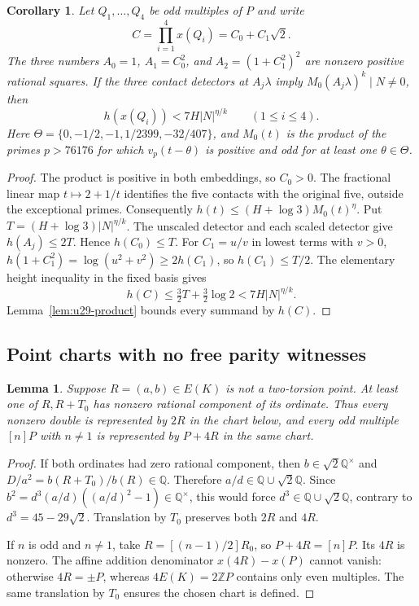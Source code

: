 \documentclass[11pt,a4paper]{article}
\newtheorem{lemma}[theorem]{Lemma}
\newtheorem{corollary}[theorem]{Corollary}
\theoremstyle{definition}
\theoremstyle{remark}
\begin{document}
\begin{corollary}\label{cor:u29-scales}
Let $Q_1,\ldots,Q_4$ be odd multiples of $P$ and write
\[
 C=\prod_{i=1}^4x(Q_i)=C_0+C_1\sqrt2.
\]
The three numbers $A_0=1$, $A_1=C_0^2$, and
$A_2=(1+C_1^2)^2$ are nonzero positive rational squares.
If the three contact detectors at $A_j\lambda$ imply
$M_0(A_j\lambda)^k\mid N\ne0$, then
\[
                         h(x(Q_i))<7H|N|^{\eta/k}
                         \qquad(1\le i\le4).
\]
Here $\Theta=\{0,-1/2,-1,1/2399,-32/407\}$, and $M_0(t)$
is the product of the primes $p>76176$ for which $v_p(t-\theta)$
is positive and odd for at least one $\theta\in\Theta$.
\end{corollary}
\begin{proof}
The product is positive in both embeddings, so $C_0>0$.
The fractional linear map $t\mapsto2+1/t$ identifies the five
contacts with the original five, outside the exceptional primes.
Consequently $h(t)\le(H+\log3)M_0(t)^{\eta}$.  Put
$T=(H+\log3)|N|^{\eta/k}$.  The unscaled detector and each scaled
detector give $h(A_j)\le2T$.  Hence $h(C_0)\le T$.
For $C_1=u/v$ in lowest terms with $v>0$,
$h(1+C_1^2)=\log(u^2+v^2)\ge2h(C_1)$, so $h(C_1)\le T/2$.
The elementary height inequality in the fixed basis gives
\[
 h(C)\le\tfrac32T+\tfrac32\log2<7H|N|^{\eta/k}.
\]
Lemma~\ref{lem:u29-product} bounds every summand by $h(C)$.
\end{proof}

\subsection{Point charts with no free parity witnesses}

\begin{lemma}\label{lem:u29-chart}
Suppose $R=(a,b)\in E(K)$ is not a two-torsion point.  At least one
of $R,R+T_0$ has nonzero rational component of its ordinate.
Thus every nonzero double is represented by $2R$ in the chart below,
and every odd multiple $[n]P$ with $n\ne1$ is represented by
$P+4R$ in the same chart.
\end{lemma}
\begin{proof}
If both ordinates had zero rational component, then
$b\in\sqrt2\mathbb Q^\times$ and
$D/a^2=b(R+T_0)/b(R)\in\mathbb Q$.  Therefore
$a/d\in\mathbb Q\cup\sqrt2\mathbb Q$.  Since
$b^2=d^3(a/d)((a/d)^2-1)\in\mathbb Q^\times$, this would force
$d^3\in\mathbb Q\cup\sqrt2\mathbb Q$, contrary to
$d^3=45-29\sqrt2$.  Translation by $T_0$ preserves both $2R$ and
$4R$.

If $n$ is odd and $n\ne1$, take $R=[(n-1)/2]R_0$, so
$P+4R=[n]P$.  Its $4R$ is nonzero.  The affine addition denominator
$x(4R)-x(P)$ cannot vanish: otherwise $4R=\pm P$, whereas
$4E(K)=2\mathbb ZP$ contains only even multiples.  The same
translation by $T_0$ ensures the chosen chart is defined.
\end{proof}
\end{document}
